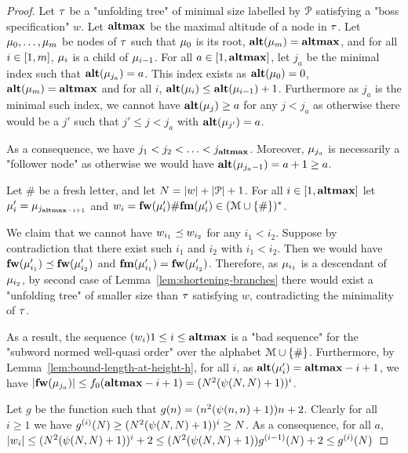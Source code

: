 \begin{proof}
	Let $\tau$ be a "unfolding tree" of minimal size labelled by $\mathcal{P}$ satisfying a "boss specification" $w$. Let $\mathbf{altmax}$ be the maximal altitude of a node in $\tau$. Let $\mu_0, \ldots, \mu_m$ be nodes of $\tau$ such that $\mu_0$ is its root, $\mathbf{alt}(\mu_m) = \mathbf{altmax}$, and for all $i\in [1,m]$, $\mu_i$ is a child of $\mu_{i-1}$.
	For all $a \in [1,\mathbf{altmax}]$, let $j_a$ be the minimal index such that $\mathbf{alt}(\mu_{j_a}) = a$. This index exists as $\mathbf{alt}(\mu_0) = 0$, $\mathbf{alt}(\mu_m) = \mathbf{altmax}$ and for all $i$, $\mathbf{alt}(\mu_{i}) \leq \mathbf{alt}(\mu_{i-1})+1$.
	Furthermore as $j_a$ is the minimal such index, we cannot have $\mathbf{alt}(\mu_j) \geq a$ for any $j < j_a$ as otherwise there would be a $j'$ such that $j' \leq j < j_a$ with $\mathbf{alt}(\mu_{j'}) = a$.
	
	As a consequence, we have $j_1 < j_2 < \ldots < j_{\mathbf{altmax}}$. Moreover, $\mu_{j_a}$ is necessarily a "follower node" as otherwise we would have $\mathbf{alt}(\mu_{j_a-1}) = a+1 \geq a$.
	
	Let $\#$ be a fresh letter, and let $N = |w| + |\mathcal{P}|+1$. For all $i \in [1,\mathbf{altmax}]$ let $\mu'_i = \mu_{j_{\mathbf{altmax} - i+1}}$ and $w_i = \mathbf{fw}(\mu'_{i}) \# \mathbf{fm}(\mu'_{i}) \in (\mathcal{M} \cup \{\#\})^*$.
	
	We claim that we cannot have $w_{i_1}\preceq w_{i_2}$ for any  $i_1< i_2$.
	Suppose by contradiction that there exist such $i_1$ and $i_2$ with $i_1 < i_2$. Then we would have $\mathbf{fw}(\mu'_{i_1}) \preceq \mathbf{fw}(\mu'_{i_2})$ and $\mathbf{fm}(\mu'_{i_1}) = \mathbf{fw}(\mu'_{i_2})$.
	Therefore, as $\mu_{i_1}$ is a descendant of $\mu_{i_2}$, by second case of Lemma~\ref{lem:shortening-branches} there would exist a "unfolding tree" of smaller size than $\tau$ satisfying $w$, contradicting the minimality of $\tau$.
	
	As a result, the sequence $(w_i){1\leq i \leq \mathbf{altmax}}$ is a "bad sequence" for the "subword normed well-quasi order" over the alphabet $\mathcal{M}\cup\{\#\}$.
	Furthermore, by Lemma~\ref{lem:bound-length-at-height-h}, for all $i$, as $\mathbf{alt}(\mu'_{i}) = \mathbf{altmax}-i+1$, we have $|\mathbf{fw}(\mu_{j_a})| \leq f_0(\mathbf{altmax}-i+1) = (N^2(\psi(N,N)+1))^{i}$.
	
	Let $g$ be the function such that $g(n) = (n^2(\psi(n,n)+1))n+2$. Clearly for all $i\geq 1$ we have $g^{(i)}(N) \geq (N^2(\psi(N,N)+1))^{i} \geq N$.
	As a consequence, for all $a$, $|w_i| \leq (N^2(\psi(N,N)+1))^{i} + 2 \leq (N^2(\psi(N,N)+1)) g^{(i-1)}(N) + 2 \leq g^{(i)}(N)$
	

\end{proof}

